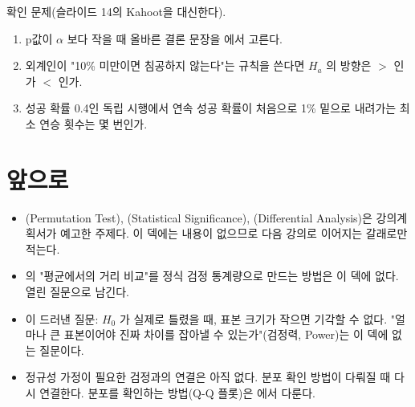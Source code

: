 확인 문제(슬라이드 14의 Kahoot을 대신한다).

\begin{enumerate}
  \item p값이 $\alpha$ 보다 작을 때 올바른 결론 문장을 
        에서 고른다.
  \item 외계인이 "10\% 미만이면 침공하지 않는다"는 규칙을 쓴다면 $H_a$ 의
        방향은 $>$ 인가 $<$ 인가.
  \item 성공 확률 0.4인 독립 시행에서 연속 성공 확률이 처음으로 1\% 밑으로
        내려가는 최소 연승 횟수는 몇 번인가.
\end{enumerate}

\section{앞으로}
\label{sec:ht-future}

\begin{itemize}
  \item {}(Permutation Test), 
        (Statistical Significance), (Differential
        Analysis)은 강의계획서가 예고한 주제다. 이 덱에는 내용이 없으므로
        다음 강의로 이어지는 갈래로만 적는다.
  \item {}의 "평균에서의 거리 비교"를 정식 검정
        통계량으로 만드는 방법은 이 덱에 없다. 열린 질문으로 남긴다.
  \item {}이 드러낸 질문: $H_0$ 가 실제로 틀렸을 때, 표본
        크기가 작으면 기각할 수 없다. "얼마나 큰 표본이어야 진짜 차이를
        잡아낼 수 있는가"(검정력, Power)는 이 덱에 없는 질문이다.
  \item 정규성 가정이 필요한 검정과의 연결은 아직 없다. 분포 확인 방법이
        다뤄질 때 다시 연결한다.
        분포를 확인하는 방법(Q-Q 플롯)은 에서 다룬다.
\end{itemize}

